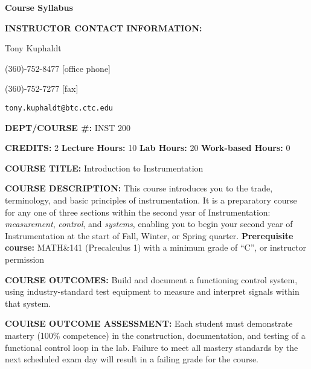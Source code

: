 


\centerline{\bf Course Syllabus} \bigskip 
 
\noindent
{\bf INSTRUCTOR CONTACT INFORMATION:}

Tony Kuphaldt

(360)-752-8477 [office phone]

(360)-752-7277 [fax]

{\tt tony.kuphaldt@btc.ctc.edu}

\vskip 10pt

\noindent
{\bf DEPT/COURSE \#:} INST 200

\vskip 10pt

\noindent
{\bf CREDITS:} 2 \hskip 30pt {\bf Lecture Hours:} 10 \hskip 30pt {\bf Lab Hours:} 20 \hskip 30pt {\bf Work-based Hours:} 0

\vskip 10pt

\noindent
{\bf COURSE TITLE:} Introduction to Instrumentation

\vskip 10pt

\noindent
{\bf COURSE DESCRIPTION:} This course introduces you to the trade, terminology, and basic principles of instrumentation.  It is a preparatory course for any one of three sections within the second year of Instrumentation: {\it measurement}, {\it control}, and {\it systems}, enabling you to begin your second year of Instrumentation at the start of Fall, Winter, or Spring quarter.  {\bf Prerequisite course:} MATH\&141 (Precalculus 1) with a minimum grade of ``C'', or instructor permission

\vskip 10pt

\noindent
{\bf COURSE OUTCOMES:} Build and document a functioning control system, using industry-standard test equipment to measure and interpret signals within that system. 

\vskip 10pt

\noindent
{\bf COURSE OUTCOME ASSESSMENT:} Each student must demonstrate mastery (100\% competence) in the construction, documentation, and testing of a functional control loop in the lab.  Failure to meet all mastery standards by the next scheduled exam day will result in a failing grade for the course.

\vskip 10pt



